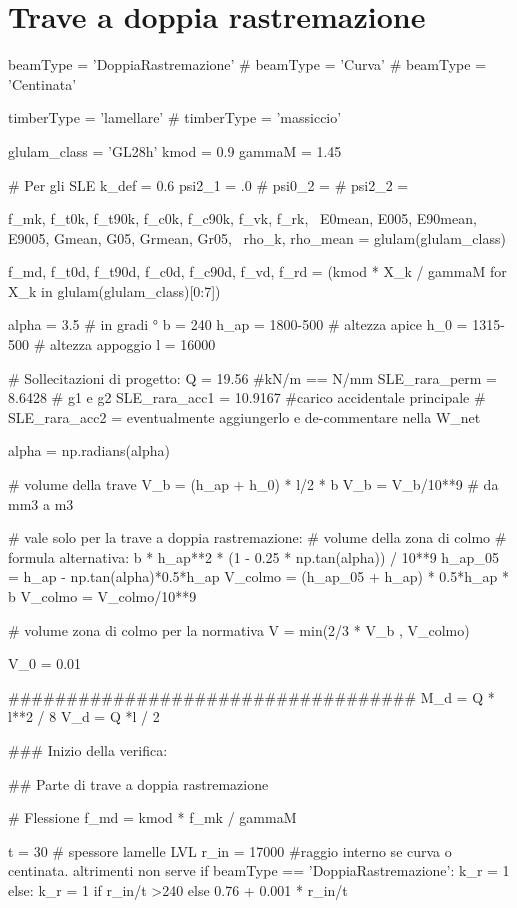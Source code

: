 \section{Trave a doppia rastremazione}
\begin{pycode}[TraveDoppiaRastremazione]
beamType = 'DoppiaRastremazione'
# beamType = 'Curva'
# beamType = 'Centinata'

timberType = 'lamellare'
# timberType = 'massiccio'

glulam_class = 'GL28h'
kmod = 0.9
gammaM = 1.45

# Per gli SLE
k_def = 0.6
psi2_1 = .0
# psi0_2 =
# psi2_2 =

f_mk, f_t0k, f_t90k, f_c0k, f_c90k, f_vk, f_rk, \
E0mean, E005, E90mean, E9005, Gmean, G05, Grmean, Gr05, \
rho_k, rho_mean = glulam(glulam_class)

f_md, f_t0d, f_t90d, f_c0d, f_c90d, f_vd, f_rd = (kmod * X_k / gammaM for X_k in glulam(glulam_class)[0:7])

alpha = 3.5 # in gradi °
b = 240
h_ap = 1800-500 # altezza apice
h_0 = 1315-500 # altezza appoggio
l = 16000 

# Sollecitazioni di progetto:
Q = 19.56 #kN/m == N/mm
SLE_rara_perm = 8.6428 # g1 e g2
SLE_rara_acc1 = 10.9167 #carico accidentale principale
# SLE_rara_acc2 =  eventualmente aggiungerlo e de-commentare nella W_net

alpha = np.radians(alpha)

# volume della trave 
V_b = (h_ap + h_0) * l/2 * b 
V_b = V_b/10**9 # da mm3 a m3

# vale solo per la trave a doppia rastremazione:
# volume della zona di colmo
# formula alternativa: b * h_ap**2 * (1 - 0.25 * np.tan(alpha)) / 10**9
h_ap_05 = h_ap - np.tan(alpha)*0.5*h_ap
V_colmo =  (h_ap_05 + h_ap) * 0.5*h_ap * b
V_colmo = V_colmo/10**9

# volume zona di colmo per la normativa
V = min(2/3 * V_b , V_colmo)

V_0 = 0.01


###################################
M_d = Q * l**2 / 8
V_d = Q *l / 2

### Inizio della verifica:

## Parte di trave a doppia rastremazione

# Flessione
f_md = kmod * f_mk / gammaM

t = 30 # spessore lamelle LVL
r_in = 17000 #raggio interno se curva o centinata. altrimenti non serve
if beamType == 'DoppiaRastremazione':
    k_r = 1
else:
    k_r = 1 if r_in/t >240 else 0.76 + 0.001 * r_in/t


\end{pycode}
